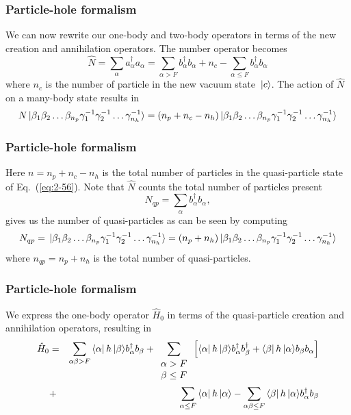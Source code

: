 \frame
{
  \frametitle{Particle-hole formalism}
\begin{small}
{\scriptsize
We can now rewrite our one-body and two-body operators in terms of the new creation and annihilation operators.
The number operator becomes
\begin{equation}
	\hat{N} = \sum_\alpha a_\alpha^\dagger a_\alpha= 
\sum_{\alpha > F} b_\alpha^\dagger b_\alpha + n_c - \sum_{\alpha \leq F} b_\alpha^\dagger b_\alpha \label{eq:2-57b}
\end{equation}
where $n_c$ is the number of particle in the new vacuum state $\,|{c}\rangle$.  
The action of $\hat{N}$ on a many-body state results in 
\begin{equation}
	N \ket{\beta_1\beta_2\dots \beta_{n_p} \gamma_1^{-1} \gamma_2^{-1} \dots \gamma_{n_h}^{-1}} = (n_p + n_c - n_h) 
		\ket{\beta_1\beta_2\dots \beta_{n_p} \gamma_1^{-1} \gamma_2^{-1} \dots \gamma_{n_h}^{-1}} \label{2-59}
\end{equation}
}
\end{small}
}
\frame
{
  \frametitle{Particle-hole formalism}
\begin{small}
{\scriptsize
Here  $n=n_p +n_c - n_h$ is the total number of particles in the quasi-particle state of 
Eq.~(\ref{eq:2-56}). Note that  $\hat{N}$ counts the total number of particles  present 
\begin{equation}
	N_{qp} = \sum_\alpha b_\alpha^\dagger b_\alpha, \label{eq:2-60}
\end{equation}
gives us the number of quasi-particles as can be seen by computing
\begin{equation}
	N_{qp}= \ket{\beta_1\beta_2\dots \beta_{n_p} \gamma_1^{-1} \gamma_2^{-1} \dots \gamma_{n_h}^{-1}}
		= (n_p + n_h)\ket{\beta_1\beta_2\dots \beta_{n_p} \gamma_1^{-1} \gamma_2^{-1} \dots \gamma_{n_h}^{-1}} \label{eq:2-61}
\end{equation}
where $n_{qp} = n_p + n_h$ is the total number of quasi-particles.
}
\end{small}
}
\frame
{
  \frametitle{Particle-hole formalism}
\begin{small}
{\scriptsize
We express the one-body operator $\hat{H}_0$ in terms of the quasi-particle creation and annihilation operators, resulting in
\begin{eqnarray}
	\hat{H}_0 &=& \sum_{\alpha\beta > F} \element{\alpha}{h}{\beta}  b_\alpha^\dagger b_\beta +
		\sum_{\begin{array}{c} \alpha > F \\ \beta \leq F \end{array}} \left[
		\element{\alpha}{h}{\beta} b_\alpha^\dagger b_\beta^\dagger + 
		\element{\beta}{h}{\alpha} b_\beta  b_\alpha \right] \nonumber \\
	&+& \sum_{\alpha \leq F} \element{\alpha}{h}{\alpha} - 
		\sum_{\alpha\beta \leq F} \element{\beta}{h}{\alpha}
		b_\alpha^\dagger b_\beta \label{eq:2-63b}
\end{eqnarray}
}
\end{small}
}
